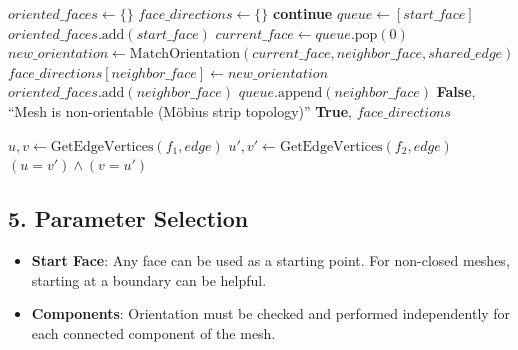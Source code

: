 \begin{algorithm}
\caption{Orient Mesh}
\label{alg:orient_mesh}
\begin{algorithmic}[1]
    \State $\mathit{oriented\_faces} \gets \{\}$
    \State $\mathit{face\_directions} \gets \{\}$
            \State \textbf{continue}
        \EndIf
        \State $\mathit{queue} \gets [\mathit{start\_face}]$
        \State $\mathit{oriented\_faces}.\text{add}(\mathit{start\_face})$
            \State $\mathit{current\_face} \gets \mathit{queue}.\text{pop}(0)$
                    \State $\mathit{new\_orientation} \gets \text{MatchOrientation}(\mathit{current\_face}, \mathit{neighbor\_face}, \mathit{shared\_edge})$
                    \State $\mathit{face\_directions}[\mathit{neighbor\_face}] \gets \mathit{new\_orientation}$
                    \State $\mathit{oriented\_faces}.\text{add}(\mathit{neighbor\_face})$
                    \State $\mathit{queue}.\text{append}(\mathit{neighbor\_face})$
                \Else
                        \State \Return \textbf{False}, ``Mesh is non-orientable (M\"obius strip topology)''
                    \EndIf
                \EndIf
            \EndFor
        \EndWhile
    \EndFor
    \State \Return \textbf{True}, $\mathit{face\_directions}$
\EndFunction

\Statex

    \State $u, v \gets \text{GetEdgeVertices}(f_1, edge)$
    \State $u', v' \gets \text{GetEdgeVertices}(f_2, edge)$
    \State \Return $(u = v') \wedge (v = u')$
\EndFunction
\end{algorithmic}
\end{algorithm}

\subsection{5. Parameter Selection}

\begin{itemize}
    \item \textbf{Start Face}: Any face can be used as a starting point. For non-closed meshes, starting at a boundary can be helpful.
    \item \textbf{Components}: Orientation must be checked and performed independently for each connected component of the mesh.
\end{itemize}

